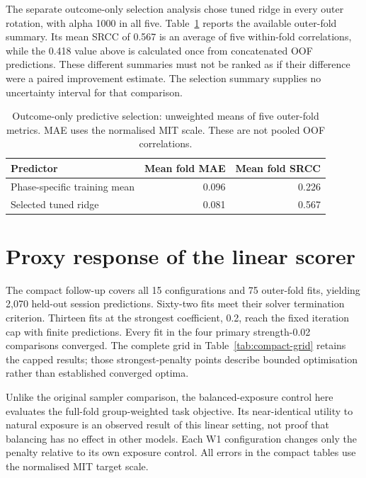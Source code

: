 The separate outcome-only selection analysis chose tuned ridge in every outer rotation,
with alpha 1000 in all five. Table~\ref{tab:ridge-selection} reports the available outer-fold
summary. Its mean SRCC of 0.567 is an average of five within-fold correlations, while the
0.418 value above is calculated once from concatenated OOF predictions. These different
summaries must not be ranked as if their difference were a paired improvement estimate.
The selection summary supplies no uncertainty interval for that comparison.

\begin{table}[htbp]
\centering
\caption{Outcome-only predictive selection: unweighted means of five outer-fold metrics.
MAE uses the normalised MIT scale. These are not pooled OOF correlations.}
\label{tab:ridge-selection}
\begin{tabular}{lrr}
\toprule
Predictor & Mean fold MAE & Mean fold SRCC \\
\midrule
Phase-specific training mean & 0.096 & 0.226 \\
Selected tuned ridge & 0.081 & 0.567 \\
\bottomrule
\end{tabular}
\end{table}
\FloatBarrier

\section{Proxy response of the linear scorer}
\label{sec:compact-mechanism-results}

The compact follow-up covers all 15 configurations and 75 outer-fold fits, yielding 2,070
held-out session predictions. Sixty-two fits meet their solver termination criterion.
Thirteen fits at the strongest coefficient, 0.2, reach the fixed iteration cap with finite
predictions. Every fit in the four primary strength-0.02 comparisons converged. The complete
grid in Table~\ref{tab:compact-grid} retains the capped results; those strongest-penalty
points describe bounded optimisation rather than established converged optima.

Unlike the original sampler comparison, the balanced-exposure control here evaluates the
full-fold group-weighted task objective. Its near-identical utility to natural exposure is
an observed result of this linear setting, not proof that balancing has no effect in other
models. Each W1 configuration changes only the penalty relative to its own exposure control.
All errors in the compact tables use the normalised MIT target scale.

